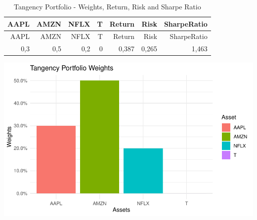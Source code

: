 \documentclass[
]{article}
\begin{document}
\begin{longtable}[]{@{}rrrrrrr@{}}
\caption{Tangency Portfolio - Weights, Return, Risk and Sharpe
Ratio}\tabularnewline
\toprule()
AAPL & AMZN & NFLX & T & Return & Risk & SharpeRatio \\
\midrule()
\endfirsthead
\toprule()
AAPL & AMZN & NFLX & T & Return & Risk & SharpeRatio \\
\midrule()
\endhead
0,3 & 0,5 & 0,2 & 0 & 0,387 & 0,265 & 1,463 \\
\bottomrule()
\end{longtable}

\begin{center}\includegraphics{EfficientFrontier_files/figure-latex/plot Tangency Portfolio-1} \end{center}
\end{document}
